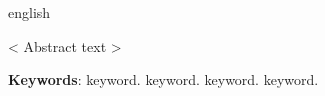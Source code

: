 \begin{resumo}[Abstract]
	\begin{otherlanguage*}{english}
		
		< Abstract text >
		
		\vspace{\onelineskip}
		
		\noindent 
		\textbf{Keywords}: keyword. keyword. keyword. keyword.
	\end{otherlanguage*}
\end{resumo}
